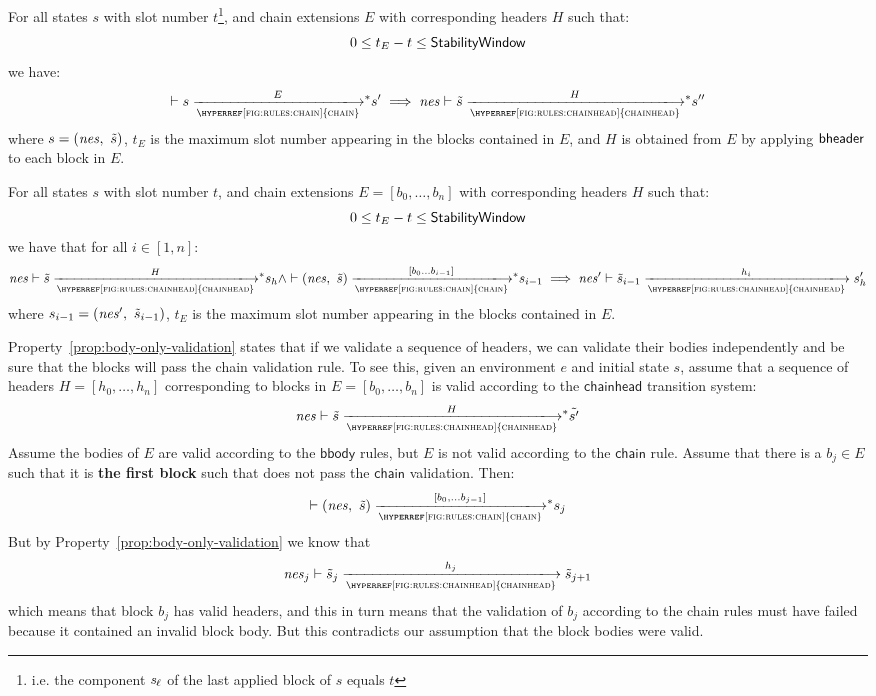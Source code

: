 \begin{property}\label{prop:header-only-validation}
  For all states $s$ with slot number $t$\footnote{i.e. the
    component $\mathit{s_\ell}$ of the last applied block of $s$ equals $t$},
    and chain extensions $E$ with corresponding headers $H$ such that:
  $$
  0 \leq t_E - t  \leq \mathsf{StabilityWindow}
  $$
  we have:
  $$
  \vdash s \transtar{\hyperref[fig:rules:chain]{chain}}{E} s'
  \implies
  \var{nes} \vdash \tilde{s} \transtar{\hyperref[fig:rules:chainhead]{chainhead}}{H} s''
  $$
  where $s=(\mathit{nes},~\tilde{s})$,
  $t_E$ is the maximum slot number appearing in the blocks contained in
  $E$, and $H$ is obtained from $E$ by applying $\mathsf{bheader}$ to each block in $E$.
\end{property}

\begin{property}\label{prop:body-only-validation}
  For all states $s$ with slot number $t$, and chain
  extensions $E = [b_0, \ldots, b_n]$ with corresponding headers $H$ such that:
  $$
  0 \leq t_E - t  \leq \mathsf{StabilityWindow}
  $$
  we have that for all $i \in [1, n]$:
  $$
  \var{nes} \vdash \tilde{s} \transtar{\hyperref[fig:rules:chainhead]{chainhead}}{H} s_{h}
  \wedge
  \vdash (\var{nes},~\tilde{s}) \transtar{\hyperref[fig:rules:chain]{chain}}{[b_0 \ldots b_{i-1}]} s_{i-1}
  \implies
  \var{nes'} \vdash \tilde{s}_{i-1}\trans{\hyperref[fig:rules:chainhead]{chainhead}}{h_i} s'_{h}
  $$
  where $s_{i-1}=(\mathit{nes'},~\tilde{s}_{i-1})$,
  $t_E$ is the maximum slot number appearing in the blocks contained in $E$.
\end{property}

Property~\ref{prop:body-only-validation} states that if we validate a sequence
of headers, we can validate their bodies independently and be sure that the
blocks will pass the chain validation rule. To see this, given an environment
$e$ and initial state $s$, assume that a sequence of headers
$H = [h_0, \ldots, h_n]$ corresponding to blocks in $E = [b_0, \ldots, b_n]$ is
valid according to the $\mathsf{chainhead}$ transition system:
%
$$
\var{nes} \vdash \tilde{s} \transtar{\hyperref[fig:rules:chainhead]{chainhead}}{H} \tilde{s'}
$$
%
Assume the bodies of $E$ are valid
according to the $\mathsf{bbody}$ rules, but $E$ is not valid according to
the $\mathsf{chain}$ rule. Assume that there is a $b_j \in E$ such that it is
\textbf{the first block} such that does not pass the $\mathsf{chain}$
validation. Then:
%
$$
\vdash (\var{nes},~\tilde{s}) \transtar{\hyperref[fig:rules:chain]{chain}}{[b_0, \ldots b_{j-1}]} s_j
$$
But by Property~\ref{prop:body-only-validation} we know that
%
$$
\var{nes}_j \vdash \tilde{s}_j \trans{\hyperref[fig:rules:chainhead]{chainhead}}{h_j} \tilde{s}_{j+1}
$$
which means that block $b_j$ has valid headers, and this in turn means that the
validation of $b_j$ according to the chain rules must have failed because it
contained an invalid block body. But this contradicts our assumption that the
block bodies were valid.

\clearpage

